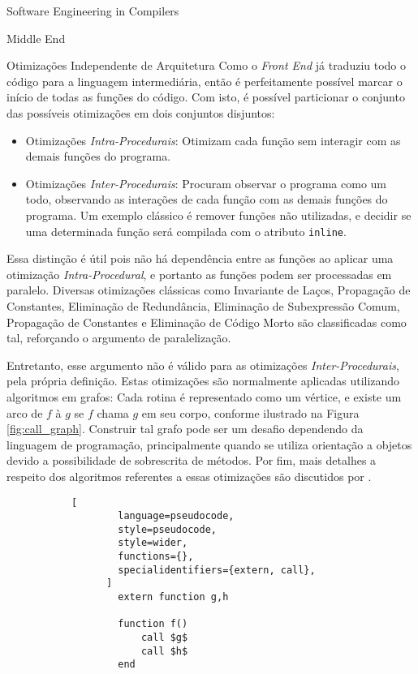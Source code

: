 \begin{section}{Software Engineering in Compilers}
\begin{subsection}{Middle End}
\begin{subsubsection}{Otimizações Independente de Arquitetura}
Como o \textit{Front End} já traduziu todo o código para a linguagem
intermediária, então é perfeitamente possível marcar o início de
todas as funções do código. Com isto, é possível particionar o
conjunto das possíveis otimizações em dois conjuntos disjuntos:

\begin{itemize}
    \item Otimizações \textit{Intra-Procedurais}: Otimizam cada função sem
interagir com as demais funções do programa.

    \item Otimizações \textit{Inter-Procedurais}: Procuram observar o programa
como um todo, observando as interações de cada função com as demais
funções do programa. Um exemplo clássico é remover funções não utilizadas, e
decidir se uma determinada função será compilada com o atributo \texttt{inline}.
\end{itemize}
Essa distinção é útil pois não há dependência entre as funções
ao aplicar uma otimização \textit{Intra-Procedural}, e portanto as
funções podem ser processadas em paralelo.
Diversas otimizações
clássicas como Invariante de Laços, Propagação de Constantes,
Eliminação de Redundância, Eliminação de Subexpressão Comum,
Propagação de Constantes e Eliminação de Código Morto são
classificadas como tal, reforçando o argumento de paralelização.

Entretanto, esse argumento não é válido para as otimizações \textit{Inter-Procedurais}, pela
própria definição. Estas otimizações são normalmente aplicadas
utilizando algoritmos em grafos:
Cada rotina é representado como um vértice, e existe um arco de $f$
à $g$ se $f$ chama $g$ em seu corpo, conforme ilustrado na Figura
\ref{fig:call_graph}. Construir tal grafo pode ser
um desafio dependendo da linguagem de programação, principalmente
quando se utiliza orientação a objetos devido a possibilidade de
sobrescrita de métodos. Por fim, mais detalhes a respeito dos
algoritmos referentes a essas otimizações são discutidos por
\cite{khedker2009data}.

\begin{figure}[ht]
\centering
  \begin{subfigure}[b]{0.40\textwidth}
      \begin{lstlisting}[
        language=pseudocode,
        style=pseudocode,
        style=wider,
        functions={},
        specialidentifiers={extern, call},
      ]
        extern function g,h

        function f()
            call $g$
            call $h$
        end


\end{lstlisting}
\end{subfigure}
\end{figure}
\end{subsubsection}
\end{subsection}
\end{section}
